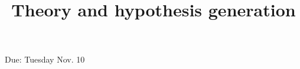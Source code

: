 \documentclass[a4, 12pt]{article}
\title{Theory and hypothesis generation}
\author{}
\date{}
\begin{document}
\maketitle

Due: Tuesday Nov. 10
\end{document}
